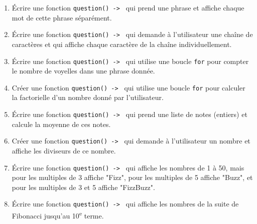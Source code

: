 \begin{enumerate}
    \item Écrire une fonction \lstinline{question() -> } qui prend une phrase et affiche chaque mot de cette phrase séparément.

    \item Écrire une fonction \lstinline{question() -> } qui demande à l'utilisateur une chaîne de caractères et qui affiche chaque caractère de la chaîne individuellement.

    \item Écrire une fonction \lstinline{question() -> } qui utilise une boucle \lstinline{for} pour compter le nombre de voyelles dans une phrase donnée.

    \item Créer une fonction \lstinline{question() -> } qui utilise une boucle \lstinline{for} pour calculer la factorielle d'un nombre donné par l'utilisateur.

    \item Écrire une fonction \lstinline{question() -> } qui prend une liste de notes (entiers) et calcule la moyenne de ces notes.

    \item Créer une fonction \lstinline{question() -> } qui demande à l'utilisateur un nombre et affiche les diviseurs de ce nombre.

    \item Écrire une fonction \lstinline{question() -> } qui affiche les nombres de 1 à 50, mais pour les multiples de 3 affiche "Fizz", pour les multiples de 5 affiche "Buzz", et pour les multiples de 3 et 5 affiche "FizzBuzz".

    \item Écrire une fonction \lstinline{question() -> } qui affiche les nombres de la suite de Fibonacci jusqu'au 10\textsuperscript{e} terme.

\end{enumerate}

